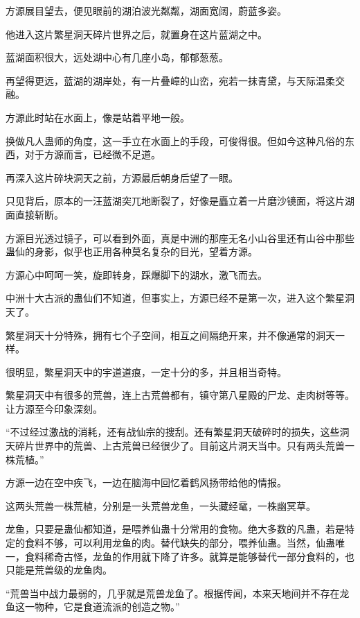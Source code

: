 
\begin{this_body}

方源展目望去，便见眼前的湖泊波光粼粼，湖面宽阔，蔚蓝多姿。

他进入这片繁星洞天碎片世界之后，就置身在这片蓝湖之中。

蓝湖面积很大，远处湖中心有几座小岛，郁郁葱葱。

再望得更远，蓝湖的湖岸处，有一片叠嶂的山峦，宛若一抹青黛，与天际温柔交融。

方源此时站在水面上，像是站着平地一般。

换做凡人蛊师的角度，这一手立在水面上的手段，可俊得很。但如今这种凡俗的东西，对于方源而言，已经微不足道。

再深入这片碎块洞天之前，方源最后朝身后望了一眼。

只见背后，原本的一汪蓝湖突兀地断裂了，好像是矗立着一片磨沙镜面，将这片湖面直接斩断。

方源目光透过镜子，可以看到外面，真是中洲的那座无名小山谷里还有山谷中那些蛊仙的身影，似乎也正用各种莫名复杂的目光，望着方源。

方源心中呵呵一笑，旋即转身，踩爆脚下的湖水，激飞而去。

中洲十大古派的蛊仙们不知道，但事实上，方源已经不是第一次，进入这个繁星洞天了。

繁星洞天十分特殊，拥有七个子空间，相互之间隔绝开来，并不像通常的洞天一样。

很明显，繁星洞天中的宇道道痕，一定十分的多，并且相当奇特。

繁星洞天中有很多的荒兽，连上古荒兽都有，镇守第八星殿的尸龙、走肉树等等。让方源至今印象深刻。

“不过经过激战的消耗，还有战仙宗的搜刮。还有繁星洞天破碎时的损失，这些洞天碎片世界中的荒兽、上古荒兽已经很少了。目前这片洞天当中。只有两头荒兽一株荒植。”

方源一边在空中疾飞，一边在脑海中回忆着鹤风扬带给他的情报。

这两头荒兽一株荒植，分别是一头荒兽龙鱼，一头藏经鼋，一株幽冥草。

龙鱼，只要是蛊仙都知道，是喂养仙蛊十分常用的食物。绝大多数的凡蛊，若是特定的食料不够，可以利用龙鱼的肉。替代缺失的部分，喂养仙蛊。当然，仙蛊唯一，食料稀奇古怪，龙鱼的作用就下降了许多。就算是能够替代一部分食料的，也只能是荒兽级的龙鱼肉。

“荒兽当中战力最弱的，几乎就是荒兽龙鱼了。根据传闻，本来天地间并不存在龙鱼这一物种，它是食道流派的创造之物。”


\end{this_body}
